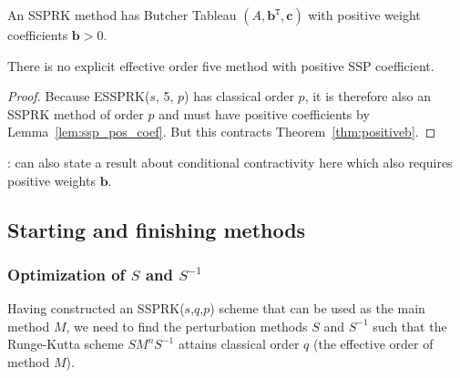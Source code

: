 \begin{lemma}\label{lem:ssp_pos_coef}\cite{Ruuth2002}
  An SSPRK method
  has Butcher Tableau \( (A,\textbf{b}^{\texttt{T}},\textbf{c}) \) with positive weight coefficients \( \textbf{b} > 0 \).
\end{lemma}

\begin{theorem}\label{thm:noESSP5}
There is no explicit effective order five method with positive SSP coefficient.
\end{theorem}

\begin{proof}
  Because ESSPRK($s$, 5, $p$) has classical order $p$, it is therefore
  also an SSPRK method of order $p$ and must have positive coefficients
  by Lemma~\ref{lem:ssp_pos_coef}.  But this contracts
  Theorem~\ref{thm:positiveb}.
\end{proof}


\begin{result}
  : can also state a result about conditional contractivity here
  which also requires positive weights $\textbf{b}$.
\end{result}



\subsection{Starting and finishing methods}\label{subsection3.2}


\subsubsection{Optimization of $ S $ and $ S^{-1} $}\label{subsection3.2.1}

Having constructed an SSPRK(\( s \),\( q \),\( p \)) scheme that can
be used as the main method \( M \), we need to find the perturbation
methods \( S \) and \( S^{-1} \) such that the Runge-Kutta scheme \(
SM^{n}S^{-1} \) attains classical order $q$ (the effective order of
method \( M \)).


